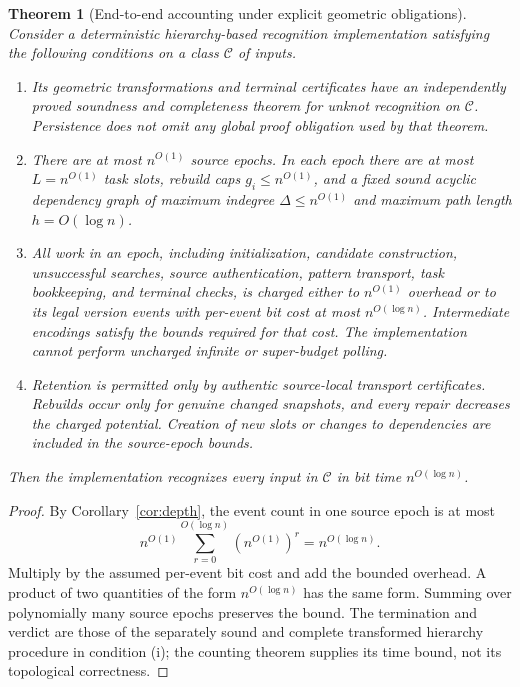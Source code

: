 \documentclass[11pt]{article}
\newtheorem{theorem}{Theorem}[section]
\theoremstyle{definition}
\begin{document}
\begin{theorem}[End-to-end accounting under explicit geometric obligations]\label{thm:qp}
Consider a deterministic hierarchy-based recognition implementation satisfying the following conditions on a class $\mathcal C$ of inputs.
\begin{enumerate}[label=(\roman*)]
\item Its geometric transformations and terminal certificates have an independently proved soundness and completeness theorem for unknot recognition on $\mathcal C$. Persistence does not omit any global proof obligation used by that theorem.
\item There are at most $n^{O(1)}$ source epochs. In each epoch there are at most $L=n^{O(1)}$ task slots, rebuild caps $g_i\leq n^{O(1)}$, and a fixed sound acyclic dependency graph of maximum indegree $\Delta\leq n^{O(1)}$ and maximum path length $h=O(\log n)$.
\item All work in an epoch, including initialization, candidate construction, unsuccessful searches, source authentication, pattern transport, task bookkeeping, and terminal checks, is charged either to $n^{O(1)}$ overhead or to its legal version events with per-event bit cost at most $n^{O(\log n)}$. Intermediate encodings satisfy the bounds required for that cost. The implementation cannot perform uncharged infinite or super-budget polling.
\item Retention is permitted only by authentic source-local transport certificates. Rebuilds occur only for genuine changed snapshots, and every repair decreases the charged potential. Creation of new slots or changes to dependencies are included in the source-epoch bounds.
\end{enumerate}
Then the implementation recognizes every input in $\mathcal C$ in bit time $n^{O(\log n)}$.
\end{theorem}
\begin{proof}
By Corollary~\ref{cor:depth}, the event count in one source epoch is at most
\[
 n^{O(1)}\sum_{r=0}^{O(\log n)}(n^{O(1)})^r=n^{O(\log n)}.
\]
Multiply by the assumed per-event bit cost and add the bounded overhead. A product of two quantities of the form $n^{O(\log n)}$ has the same form. Summing over polynomially many source epochs preserves the bound. The termination and verdict are those of the separately sound and complete transformed hierarchy procedure in condition (i); the counting theorem supplies its time bound, not its topological correctness.
\end{proof}
\end{document}
